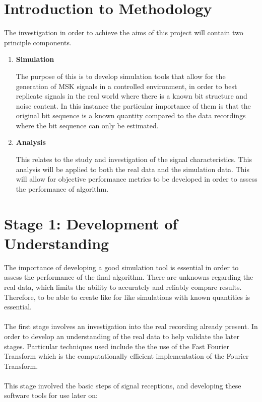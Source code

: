 \section{Introduction to Methodology}
The investigation in order to achieve the aims of this project will contain two principle components. 
\begin{enumerate}
    \item \textbf{Simulation}
    
    The purpose of this is to develop simulation tools that allow for the generation of MSK signals in a controlled environment, in order to best replicate signals in the real world where there is a known bit structure and noise content. In this instance the particular importance of them is that the original bit sequence is a known quantity compared to the data recordings where the bit sequence can only be estimated. 
    
    \item \textbf{Analysis}
    
    This relates to the study and investigation of the signal characteristics. This analysis will be applied to both the real data and the simulation data. This will allow for objective performance metrics to be developed in order to assess the performance of algorithm.
\end{enumerate}


\section{Stage 1: Development of Understanding} 
The importance of developing a good simulation tool is essential in order to assess the performance of the final algorithm. There are unknowns regarding the real data, which limits the ability to accurately and reliably compare results. Therefore, to be able to create like for like simulations with known quantities is essential.
\\\\
The first stage involves an investigation into the real recording already present. In order to develop an understanding of the real data to help validate the later stages. Particular techniques used include the the use of the Fast Fourier Transform which is the computationally efficient implementation of the Fourier Transform.
\\\\
This stage involved the basic steps of signal receptions, and developing these software tools for use later on:

